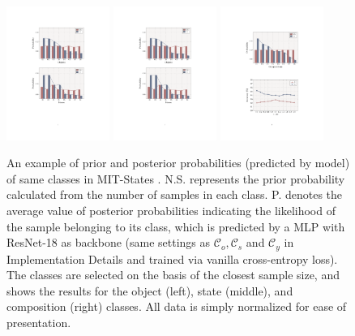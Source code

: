 \documentclass[letterpaper]{article} %
\theoremstyle{definition}
\begin{document}
\begin{figure}[t]
		\centering
		\subfigure 
		{
			\includegraphics[width=0.300\textwidth]{ Fig_11.pdf}
		}
        \subfigure 
		{
			\includegraphics[width=0.300\textwidth]{ Fig_12.pdf}
		}
         \subfigure 
		{
			\includegraphics[width=0.300\textwidth]{ Fig_13.pdf}
		}
		\caption{An example of prior and posterior probabilities (predicted by model) of same classes in MIT-States \cite{mit}. N.S. represents the prior probability calculated from the number of samples in each class. P. denotes the average value of posterior probabilities indicating the likelihood of the sample belonging to its class, which is predicted by a MLP with ResNet-18 \cite{resnet} as backbone (same settings as $\mathcal{C}_{o},\mathcal{C}_{s}$ and $\mathcal{C}_{y}$ in Implementation Details and trained via vanilla cross-entropy loss). The classes are selected on the basis of the closest sample size, and shows the results for the object (left), state (middle), and composition (right) classes. All data is simply normalized for ease of presentation.}
		\label{fig1}
	\end{figure}
 
\end{document}
